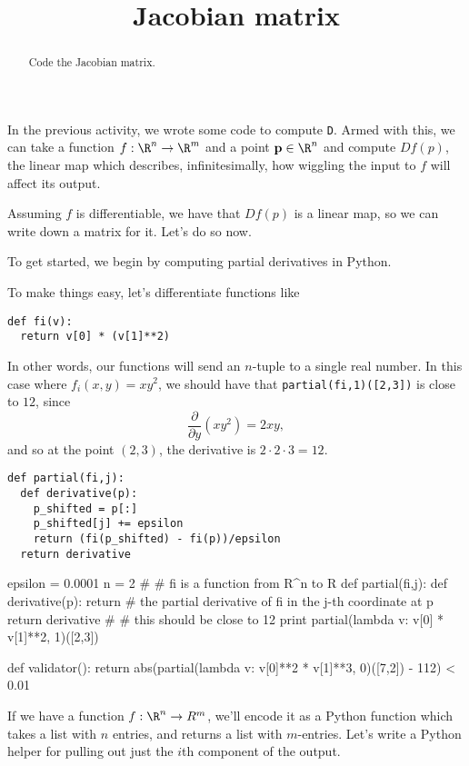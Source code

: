 \documentclass{ximera}
\title{Jacobian matrix}
\begin{document}
\begin{abstract}
  Code the Jacobian matrix.
\end{abstract}

In the previous activity, we wrote some code to compute \texttt{D}.
Armed with this, we can take a function $f : \R^n \to \R^m$ and a
point $\mathbf{p} \in \R^n$ and compute $Df(p)$, the linear map which
describes, infinitesimally, how wiggling the input to $f$ will affect
its output.

Assuming $f$ is differentiable, we have that $Df(p)$ is a linear map,
so we can write down a matrix for it.  Let's do so now.

\begin{exercise}
To get started, we begin by computing partial derivatives in Python.

To make things easy, let's differentiate functions like 
\begin{verbatim}
def fi(v):
  return v[0] * (v[1]**2)
\end{verbatim}
In other words, our functions will send an $n$-tuple to a single real number.
In this case where $f_i(x,y) = xy^2$, we should have that \texttt{partial(fi,1)([2,3])} is close to $12$, since
$$
\frac{\partial}{\partial y} \left( x y^2 \right) = 2 xy,
$$
and so at the point $(2,3)$, the derivative is $2 \cdot 2 \cdot 3 = 12$.

\begin{solution}
  \begin{hint}
\begin{verbatim}
def partial(fi,j):
  def derivative(p):
    p_shifted = p[:]
    p_shifted[j] += epsilon
    return (fi(p_shifted) - fi(p))/epsilon
  return derivative
\end{verbatim}
  \end{hint}
  \begin{python}
epsilon = 0.0001
n = 2
#
# fi is a function from R^n to R
def partial(fi,j):
  def derivative(p):
    return # the partial derivative of fi in the j-th coordinate at p
  return derivative
#
# this should be close to 12
print partial(lambda v: v[0] * v[1]**2, 1)([2,3])

def validator():
  return abs(partial(lambda v: v[0]**2 * v[1]**3, 0)([7,2]) - 112) < 0.01
  \end{python}
\end{solution}

If we have a function $f : \R^n \to R^m$, we'll encode it as a Python
function which takes a list with $n$ entries, and returns a list with
$m$-entries.  Let's write a Python helper for pulling out just the
$i$th component of the output.


\end{exercise}
\end{document}
